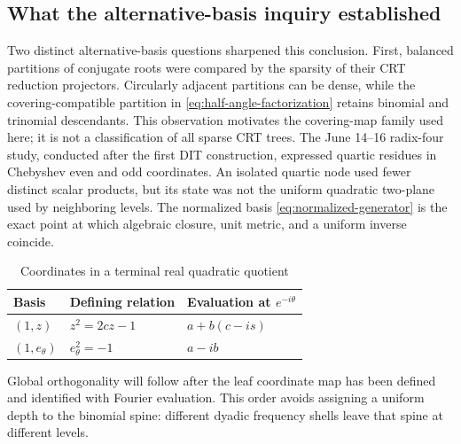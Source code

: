 \subsection{What the alternative-basis inquiry established}

Two distinct alternative-basis questions sharpened this conclusion.  First,
balanced partitions of conjugate roots were compared by the sparsity of their
CRT reduction projectors.  Circularly adjacent partitions can be dense, while
the covering-compatible partition in \eqref{eq:half-angle-factorization}
retains binomial and trinomial descendants.  This observation motivates the
covering-map family used here; it is not a classification of all sparse CRT
trees.  The June 14--16 radix-four study, conducted after the first DIT
construction, expressed quartic residues in Chebyshev even and odd coordinates.
An isolated quartic node used fewer distinct scalar products, but its state was
not the uniform quadratic two-plane used by neighboring levels.  The normalized basis
\eqref{eq:normalized-generator} is the exact point at which algebraic closure,
unit metric, and a uniform inverse coincide.

\begin{table}[t]
\caption{Coordinates in a terminal real quadratic quotient}
\label{tab:bases}
\centering
\footnotesize
\begin{tabularx}{\columnwidth}{@{}lXX@{}}
\toprule
Basis & Defining relation & Evaluation at $e^{-i\theta}$\\
\midrule
$(1,z)$ & $z^2=2cz-1$ & $a+b(c-is)$\\
$(1,e_\theta)$ & $e_\theta^2=-1$ & $a-ib$\\
\bottomrule
\end{tabularx}
\end{table}

Global orthogonality will follow after the leaf coordinate map has been defined
and identified with Fourier evaluation.  This order avoids assigning a uniform
depth to the binomial spine: different dyadic frequency shells leave that spine
at different levels.
